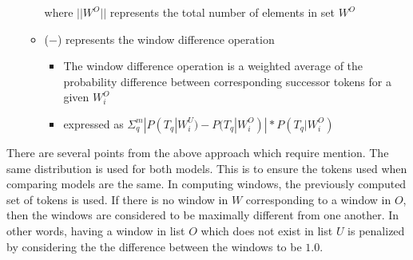 \begin{enumerate}
\begin{itemize}
    where $||W^O||$ represents the total number of elements in set $W^O$
  \item ($-$) represents the window difference operation
    \begin{itemize}
    \item The window difference operation is
      a weighted average of the probability difference
      between corresponding successor tokens for a given $W_i^O$
    \item expressed as $\Sigma_q^m |P(T_q|W_i^U)-P(T_q|W_i^O)| * P(T_q|W_i^O)$
    \end{itemize}
  \end{itemize}
\end{enumerate}
%
There are several points from the above approach which require mention.
%
The same distribution is used for both models.
This is to ensure the tokens used when comparing models are the same.
%
In computing windows, 
the previously computed set of tokens is used.
%
%
If there is no window in $W$ corresponding to a window in $O$,
then the windows are considered to be maximally different from one another.
In other words,
having a window in list $O$ which does not exist in list $U$ is
penalized by considering the the difference between the windows to be $1.0$.





